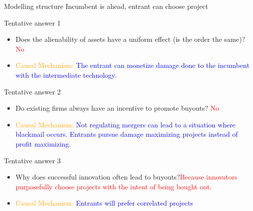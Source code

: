 \documentclass{beamer}
\numberwithin{equation}{section}
\begin{document}
\begin{frame}{Modelling structure}
Incumbent is ahead, entrant can choose project 
\end{frame}
\begin{frame}{Tentative answer 1}
\begin{itemize}
    \item Does the alienability of assets have a uniform effect (is the order the same)? \textcolor{red}{No}
    \item \textcolor{orange}{Causal Mechanism:} \textcolor{blue}{The entrant can monetize damage done to the incumbent with the intermediate technology.}
\end{itemize}
\end{frame}
\begin{frame}{Tentative answer 2}
\begin{itemize}
    \item Do existing firms always have an incentive to promote buyouts? \textcolor{red}{No}
    \item \textcolor{orange}{Causal Mechanism:} \textcolor{blue}{Not regulating mergers can lead to a situation where blackmail occurs. Entrants pursue damage maximizing projects instead of profit maximizing.}
\end{itemize}
\end{frame}
\begin{frame}{Tentative answer 3}
\begin{itemize}
    \item Why does successful innovation often lead to buyouts?\textcolor{red}{Because innovators purposefully choose projects with the intent of being bought out.}
    \item \textcolor{orange}{Causal Mechanism:} \textcolor{blue}{Entrants will prefer correlated projects}
\end{itemize}
\end{frame}
\end{document}
